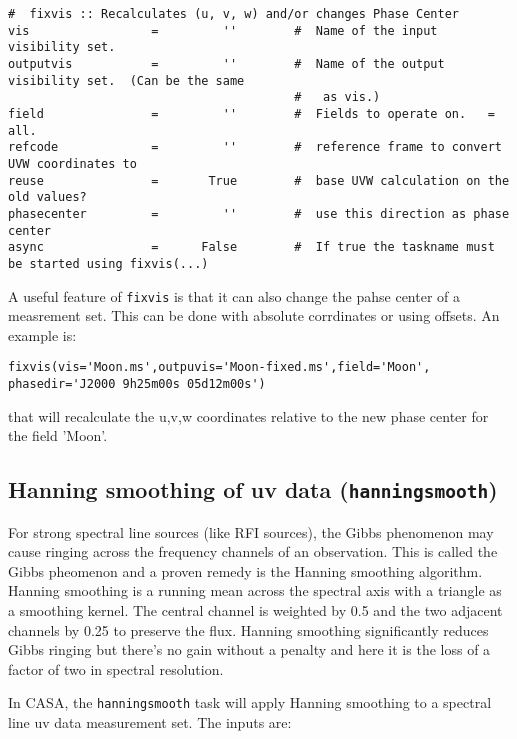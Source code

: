 {\small
\begin{verbatim}
#  fixvis :: Recalculates (u, v, w) and/or changes Phase Center 
vis                 =         ''        #  Name of the input visibility set.
outputvis           =         ''        #  Name of the output visibility set.  (Can be the same
                                        #   as vis.)
field               =         ''        #  Fields to operate on.   = all.
refcode             =         ''        #  reference frame to convert UVW coordinates to
reuse               =       True        #  base UVW calculation on the old values?
phasecenter         =         ''        #  use this direction as phase center
async               =      False        #  If true the taskname must be started using fixvis(...)
\end{verbatim}
\normalsize

A useful feature of {\tt fixvis} is that it can also change the pahse
center of a measrement set. This can be done with absolute corrdinates
or using offsets. An example is:
\small
\begin{verbatim}
fixvis(vis='Moon.ms',outpuvis='Moon-fixed.ms',field='Moon', phasedir='J2000 9h25m00s 05d12m00s')
\end{verbatim}
\normalsize

that will recalculate the u,v,w coordinates relative to the new phase
center for the field 'Moon'.



\subsection{Hanning smoothing of uv data ({\tt hanningsmooth})}
\label{section:cal.other.hanningsmooth}

For strong spectral line sources (like RFI sources), the Gibbs
phenomenon may cause ringing across the frequency channels of an
observation. This is called the Gibbs pheomenon and a proven remedy is
the Hanning smoothing algorithm. Hanning smoothing is a running mean
across the spectral axis with a triangle as a smoothing kernel. The
central channel is weighted by 0.5 and the two adjacent channels by
0.25 to preserve the flux. Hanning smoothing significantly reduces
Gibbs ringing but there's no gain without a penalty and here it is the
loss of a factor of two in spectral resolution.

In CASA, the {\tt hanningsmooth} task will apply Hanning smoothing to a
spectral line uv data measurement set.  The inputs are:

}
